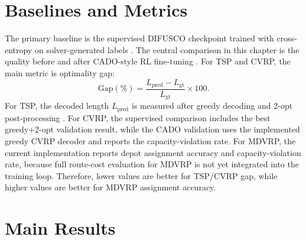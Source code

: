 \section{Baselines and Metrics}
\label{sec:metrics}

The primary baseline is the supervised DIFUSCO checkpoint trained with cross-entropy on solver-generated labels \citep{sun2023difusco}. The central comparison in this chapter is the quality before and after CADO-style RL fine-tuning \citep{yoon2024cado}. For TSP and CVRP, the main metric is optimality gap:
\[
\mathrm{Gap}(\%) =
\frac{L_{\mathrm{pred}} - L_{\mathrm{gt}}}{L_{\mathrm{gt}}}\times 100.
\]
For TSP, the decoded length \(L_{\mathrm{pred}}\) is measured after greedy decoding and 2-opt post-processing \citep{croes1958method}. For CVRP, the supervised comparison includes the best greedy+2-opt validation result, while the CADO validation uses the implemented greedy CVRP decoder and reports the capacity-violation rate. For MDVRP, the current implementation reports depot assignment accuracy and capacity-violation rate, because full route-cost evaluation for MDVRP is not yet integrated into the training loop. Therefore, lower values are better for TSP/CVRP gap, while higher values are better for MDVRP assignment accuracy.

\section{Main Results}
\label{sec:main-results}

\begin{table}[t]
\centering
\caption{Before/after comparison for CADO-style RL fine-tuning \citep{yoon2024cado}. For TSP and CVRP,
\(\Delta\) is the reduction in optimality gap. For MDVRP, \(\Delta\) is the gain in assignment
accuracy within the CADO fine-tuning run.}
\label{tab:main-results}
\end{table}

